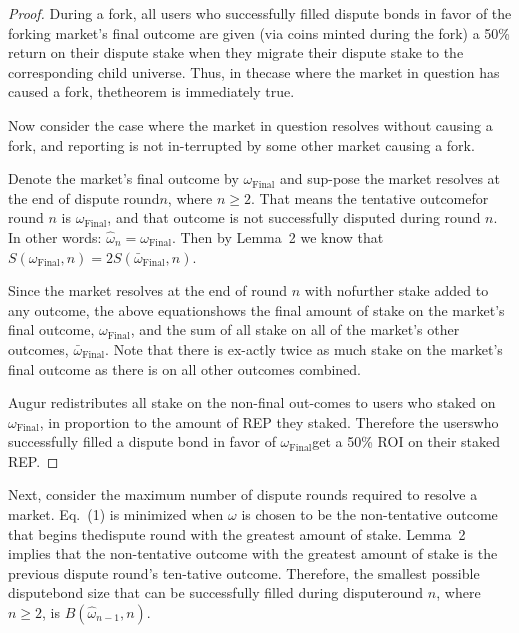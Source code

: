 \documentclass[12pt,floatfix,reprint,nofootinbib,amsmath,amssymb,epsfig,pre,floats,letterpaper,groupedaffiliation]{revtex4-1}
\theoremstyle{definition}
\theoremstyle{definition}
\begin{document}
\begin{proof}
During a fork, all users who successfully filled dispute bonds in favor of the forking market's final outcome are given (via coins minted during the fork) a 50\% return on their dispute stake when they migrate their dispute stake to the corresponding child universe. Thus, in the\linebreak case where the market in question has caused a fork, the\linebreak theorem is immediately true.

Now consider the case where the market in question resolves without causing a fork, and reporting is not in-\linebreak terrupted by some other market causing a fork.

Denote the market's final outcome by $\omega_{\text{Final}}$ and sup-\linebreak pose the market resolves at the end of dispute round\linebreak $n$, where $n \geq 2$. That means the tentative outcome\linebreak for round $n$ is $\omega_{\text{Final}}$, and that outcome is not successfully disputed during round $n$. In other words: $\hat{\omega}_n = \omega_{\text{Final}}$. Then by Lemma~2 we know that $S(\omega_{\text{Final}}, n) = 2S(\bar{\omega}_{\text{Final}}, n)$.

Since the market resolves at the end of round $n$ with no\linebreak further stake added to any outcome, the above equation\linebreak shows the final amount of stake on the market's final outcome, $\omega_{\text{Final}}$, and the sum of all stake on all of the market's other outcomes, $\bar{\omega}_{\text{Final}}$. Note that there is ex-\linebreak actly twice as much stake on the market's final outcome as there is on all other outcomes combined.

Augur redistributes all stake on the non-final out-\linebreak comes to users who staked on $\omega_{\text{Final}}$, in proportion to the amount of REP they staked. Therefore the users\linebreak who successfully filled a dispute bond in favor of $\omega_{\text{Final}}$\linebreak get a 50\% ROI on their staked REP.
\end{proof}

Next, consider the maximum number of dispute rounds required to resolve a market. Eq.~(1) is minimized when $\omega$ is chosen to be the non-tentative outcome that begins the\linebreak dispute round with the greatest amount of stake. Lemma\pagebreak~2 implies that the non-tentative outcome with the greatest amount of stake is the previous dispute round's ten-\linebreak tative outcome. Therefore, the smallest possible dispute\linebreak bond size that can be successfully filled during dispute\linebreak round $n$, where $n \geq 2$, is $B(\hat{\omega}_{n-1}, n)$.
\end{document}

